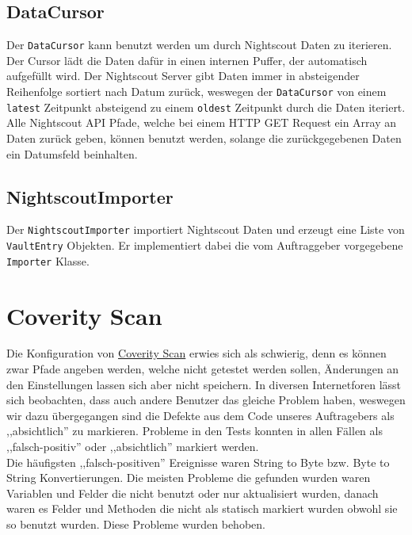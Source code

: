 \documentclass[accentcolor=tud0b,12pt,paper=a4]{tudreport}
\begin{document}
\subsection{DataCursor}
Der \texttt{DataCursor} kann benutzt werden um durch Nightscout Daten zu iterieren. Der Cursor lädt die Daten dafür in einen internen Puffer, der automatisch aufgefüllt wird. Der Nightscout Server gibt Daten immer in absteigender Reihenfolge sortiert nach Datum zurück, weswegen der \texttt{DataCursor} von einem \texttt{latest} Zeitpunkt absteigend zu einem \texttt{oldest} Zeitpunkt durch die Daten iteriert. Alle Nightscout API Pfade, welche bei einem HTTP GET Request ein Array an Daten zurück geben, können benutzt werden, solange die zurückgegebenen Daten ein Datumsfeld beinhalten.


\subsection{NightscoutImporter}
Der \texttt{NightscoutImporter} importiert Nightscout Daten und erzeugt eine Liste von \texttt{VaultEntry} Objekten. Er implementiert dabei die vom Auftraggeber vorgegebene \texttt{Importer} Klasse.


\section{Coverity Scan}
Die Konfiguration von \href{https://scan.coverity.com/projects/tuda-bp-11-opendiabetes-uam-heuristik}{Coverity Scan} erwies sich als schwierig, denn es können zwar Pfade angeben werden, welche nicht getestet werden sollen, Änderungen an den Einstellungen lassen sich aber nicht speichern. In diversen Internetforen lässt sich beobachten, dass auch andere Benutzer das gleiche Problem haben, weswegen wir dazu übergegangen sind die Defekte aus dem Code unseres Auftragebers als ,,absichtlich'' zu markieren. Probleme in den Tests konnten in allen Fällen als ,,falsch-positiv'' oder ,,absichtlich'' markiert werden.\\
Die häufigsten ,,falsch-positiven'' Ereignisse waren String to Byte bzw. Byte to String Konvertierungen.
Die meisten Probleme die gefunden wurden waren Variablen und Felder die nicht benutzt oder nur aktualisiert wurden, danach waren es Felder und Methoden die nicht als statisch markiert wurden obwohl sie so benutzt wurden. Diese Probleme wurden behoben.
\end{document}
